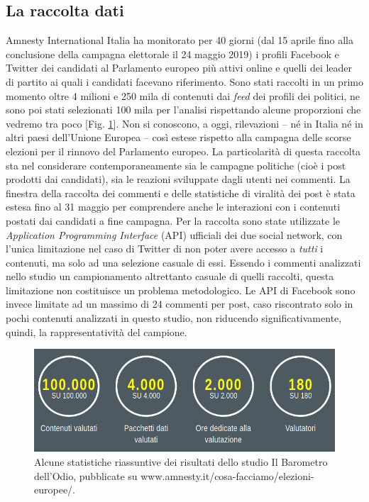 \subsection{La raccolta dati}
Amnesty International Italia ha monitorato per 40  giorni  (dal  15  aprile fino alla conclusione della campagna elettorale il 24 maggio 2019) i profili Facebook e Twitter dei candidati al Parlamento europeo più attivi online e quelli dei leader di partito ai quali i candidati facevano riferimento. Sono stati raccolti in un primo momento oltre 4 milioni e 250 mila di contenuti dai \textit{feed} dei profili dei politici, ne sono poi stati selezionati 100 mila per l'analisi rispettando alcune proporzioni che vedremo tra poco [Fig. \ref{fig:barometro}]. Non si conoscono, a oggi, rilevazioni – né in Italia né in altri paesi dell’Unione Europea – così estese rispetto alla campagna delle scorse elezioni per il rinnovo del Parlamento europeo. La particolarità di questa raccolta sta nel considerare contemporaneamente sia le campagne politiche (cioè i post prodotti dai candidati), sia le reazioni sviluppate dagli utenti nei commenti. La finestra della raccolta dei commenti e delle statistiche di viralità dei post è stata estesa fino al 31 maggio per comprendere anche le interazioni con i contenuti postati dai candidati a fine campagna. Per la raccolta sono state utilizzate le \textit{Application Programming Interface} (API) ufficiali dei due social network, con l'unica limitazione nel caso di Twitter di non poter avere accesso a \textit{tutti} i contenuti, ma solo ad una selezione casuale di essi. Essendo i commenti analizzati nello studio un campionamento altrettanto casuale di quelli raccolti, questa limitazione non costituisce un problema metodologico. Le API di Facebook sono invece limitate ad un massimo di 24 commenti per post, caso riscontrato solo in pochi contenuti analizzati in questo studio, non riducendo significativamente, quindi, la rappresentatività del campione.
\begin{figure}
	\includegraphics[width=\textwidth]{figures/barometro}
	\caption{Alcune statistiche riassuntive dei risultati dello studio Il Barometro dell'Odio, pubblicate su www.amnesty.it/cosa-facciamo/elezioni-europee/.}
	\label{fig:barometro}
\end{figure}

